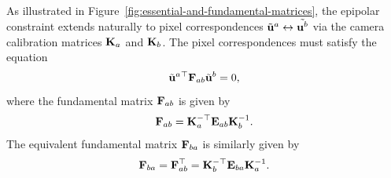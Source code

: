 As illustrated in Figure~\ref{fig:essential-and-fundamental-matrices}, the epipolar constraint extends naturally to pixel correspondences $\tilde{{\boldsymbol{\mathbf{u}}}}^a \leftrightarrow \tilde{{\boldsymbol{\mathbf{u}}}^b}$ via the camera calibration matrices ${\boldsymbol{\mathbf{K}}}_a$ and ${\boldsymbol{\mathbf{K}}}_b$.
The pixel correspondences must satisfy the equation
\begin{equation} \label{eq:fundamental-epipolar-constraint}
  \tilde{{\boldsymbol{\mathbf{u}}}}^a{}^{\top} {\boldsymbol{\mathbf{F}}}_{ab} \tilde{{\boldsymbol{\mathbf{u}}}}^b = 0,
\end{equation}
where the fundamental matrix ${\boldsymbol{\mathbf{F}}}_{ab}$ is given by
\begin{equation}
  {\boldsymbol{\mathbf{F}}}_{ab} = {\boldsymbol{\mathbf{K}}}_a^{-\top} {\boldsymbol{\mathbf{E}}}_{ab} {\boldsymbol{\mathbf{K}}}_b^{-1}.
\end{equation}
The equivalent fundamental matrix ${\boldsymbol{\mathbf{F}}}_{ba}$ is similarly given by
\begin{equation}
    {\boldsymbol{\mathbf{F}}}_{ba} = {\boldsymbol{\mathbf{F}}}_{ab}^{\top} = {\boldsymbol{\mathbf{K}}}_b^{-\top} {\boldsymbol{\mathbf{E}}}_{ba} {\boldsymbol{\mathbf{K}}}_a^{-1}.
\end{equation}

